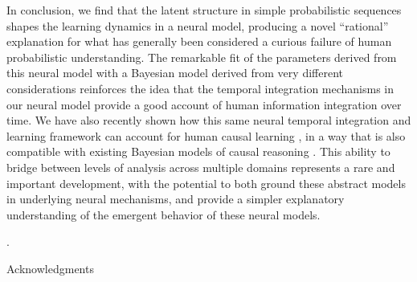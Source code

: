 \documentclass[11pt]{article}
\newcounter{lastnote}
\newenvironment{scilastnote}{%
\setcounter{lastnote}{\value{enumiv}}%
\addtocounter{lastnote}{+1}%
\begin{list}%
{\arabic{lastnote}.}
{\setlength{\leftmargin}{.22in}}
{\setlength{\labelsep}{.5em}}}
{\end{list}}
\begin{document}
\vskip6pt

In conclusion, we find that the latent structure in simple probabilistic sequences shapes the learning dynamics in a neural model, producing a novel ``rational'' explanation for what has generally been considered a curious failure of human probabilistic understanding.
The remarkable fit of the parameters derived from this neural model with a Bayesian model derived from very different considerations reinforces the idea that the temporal integration mechanisms in our neural model provide a good account of human information integration over time.
We have also recently shown how this same neural temporal integration and learning framework can account for human causal learning \cite{OReilly2014blicket}, in a way that is also compatible with existing Bayesian models of causal reasoning \cite{Griffiths2010TiCS}.
This ability to bridge between levels of analysis across multiple domains represents a rare and important development, with the potential to both ground these abstract models in underlying neural mechanisms, and provide a simpler explanatory understanding of the emergent behavior of these neural models.









\begin{scilastnote}
\item Acknowledgments
\end{scilastnote}
\end{document}

